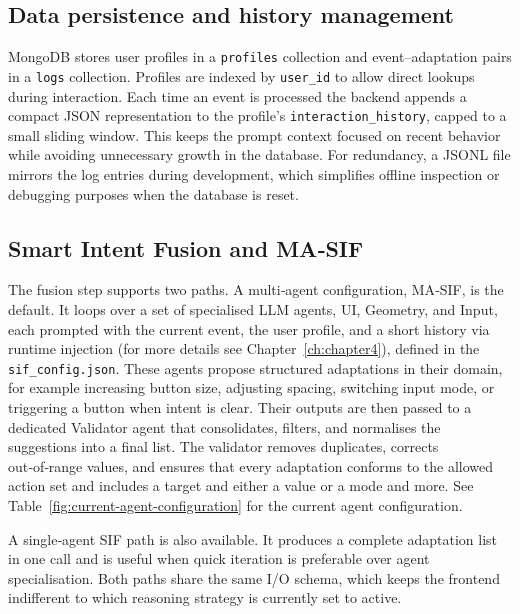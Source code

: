 \subsection{Data persistence and history management}
MongoDB stores user profiles in a \texttt{profiles} collection and event–adaptation pairs in a \texttt{logs} collection. Profiles are indexed by \texttt{user\_id} to allow direct lookups during interaction. Each time an event is processed the backend appends a compact JSON representation to the profile’s \texttt{interaction\_history}, capped to a small sliding window. This keeps the prompt context focused on recent behavior while avoiding unnecessary growth in the database. For redundancy, a JSONL file mirrors the log entries during development, which simplifies offline inspection or debugging purposes when the database is reset.

\subsection{Smart Intent Fusion and MA‑SIF}
The fusion step supports two paths. A multi‑agent configuration, MA‑SIF, is the default. It loops over a set of specialised LLM agents, UI, Geometry, and Input, each prompted with the current event, the user profile, and a short history via runtime injection (for more details see Chapter~\ref{ch:chapter4}), defined in the \texttt{sif\_config.json}. These agents propose structured adaptations in their domain, for example increasing button size, adjusting spacing, switching input mode, or triggering a button when intent is clear. Their outputs are then passed to a dedicated Validator agent that consolidates, filters, and normalises the suggestions into a final list. The validator removes duplicates, corrects out‑of‑range values, and ensures that every adaptation conforms to the allowed action set and includes a target and either a value or a mode and more. See Table~\ref{fig:current-agent-configuration} for the current agent configuration.

A single‑agent SIF path is also available. It produces a complete adaptation list in one call and is useful when quick iteration is preferable over agent specialisation. Both paths share the same I/O schema, which keeps the frontend indifferent to which reasoning strategy is currently set to active.

